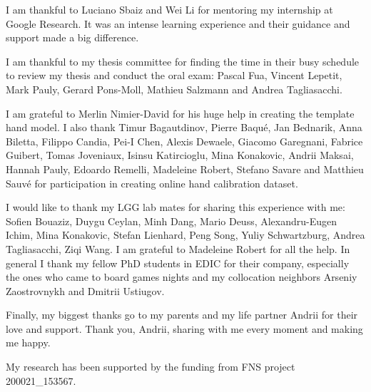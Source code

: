 I am thankful to Luciano Sbaiz and Wei Li for mentoring my internship at Google Research. It was an intense learning experience and their guidance and support made a big difference.

I am thankful to my thesis committee for finding the time in their busy schedule to review my thesis and conduct the oral exam: Pascal Fua, Vincent Lepetit, Mark Pauly, Gerard Pons-Moll, Mathieu Salzmann and Andrea Tagliasacchi.

I am grateful to Merlin Nimier-David for his huge help in creating the template hand model. I also thank Timur Bagautdinov, Pierre Baqué, Jan Bednarik, Anna Biletta, Filippo Candia, Pei-I Chen, Alexis Dewaele, Giacomo Garegnani, Fabrice Guibert, Tomas Joveniaux, Isinsu Katircioglu, Mina Konakovic, Andrii Maksai, Hannah Pauly, Edoardo Remelli, Madeleine Robert, Stefano Savare and Matthieu Sauvé for participation in creating online hand calibration dataset.

I would like to thank my LGG lab mates for sharing this experience with me: Sofien Bouaziz, Duygu Ceylan, Minh Dang, Mario Deuss, Alexandru-Eugen Ichim, Mina Konakovic, Stefan Lienhard, Peng Song, Yuliy Schwartzburg, Andrea Tagliasacchi, Ziqi Wang. I am grateful to Madeleine Robert for all the help. In general I thank my fellow PhD students in EDIC for their company, especially the ones who came to board games nights and my collocation neighbors Arseniy Zaostrovnykh and Dmitrii Ustiugov.

Finally, my biggest thanks go to my parents and my life partner Andrii for their love and support. Thank you, Andrii, sharing with me every moment and making me happy.

My research has been supported by the funding from FNS project 200021\_153567.

 
